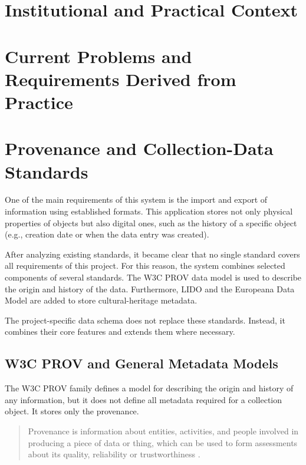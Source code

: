 \section{Institutional and Practical Context}\label{sec:related-work:context}

\section{Current Problems and Requirements Derived from Practice}\label{sec:related-work:requirements}

\setauthor{\firstauthor}
\section{Provenance and Collection-Data Standards}\label{sec:related-work:standards}

One of the main requirements of this system is the import and export of information using established formats. This application stores not only physical properties of objects but also digital ones, such as the history of a specific object (e.g., creation date or when the data entry was created).

After analyzing existing standards, it became clear that no single standard covers all requirements of this project. For this reason, the system combines selected components of several standards. The W3C PROV data model is used to describe the origin and history of the data. Furthermore, LIDO and the Europeana Data Model are added to store cultural-heritage metadata.

The project-specific data schema does not replace these standards. Instead, it combines their core features and extends them where necessary.

\subsection{W3C PROV and General Metadata Models}\label{sec:related-work:standards:prov}
The W3C PROV family defines a model for describing the origin and history of any information, but it does not define all metadata required for a collection object. It stores only the provenance.

\begin{quote}
	Provenance is information about entities, activities, and people involved in producing a piece of data or thing, which can be used to form assessments about its quality, reliability or trustworthiness \cite{groth2013provoverview}.
\end{quote}

